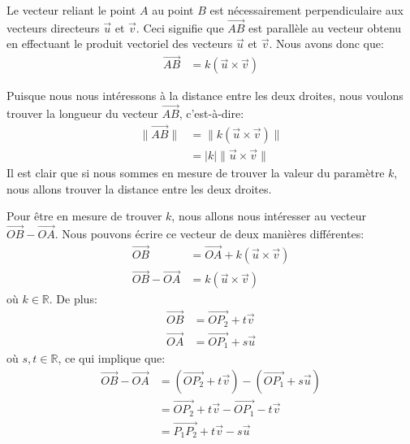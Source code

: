 \documentclass[]{book}
\theoremstyle{definition}
\theoremstyle{definition}
\theoremstyle{definition}
\theoremstyle{remark}
\begin{document}
Le vecteur reliant le point \(A\) au point \(B\) est nécessairement perpendiculaire aux vecteurs directeurs \(\vec u\) et \(\vec v\). Ceci signifie que \(\overrightarrow{AB}\) est parallèle au vecteur obtenu en effectuant le produit vectoriel des vecteurs \(\vec u\) et \(\vec v\). Nous avons donc que:
\begin{align*}
\overrightarrow{AB} &= k (\vec u \times \vec v)
\end{align*}

Puisque nous nous intéressons à la distance entre les deux droites, nous voulons trouver la longueur du vecteur \(\overrightarrow{AB}\), c'est-à-dire:
\begin{align*}
\lVert\overrightarrow{AB}\rVert &= \lVert k (\vec u \times \vec v)\rVert \\
&= |k| \lVert\vec u \times \vec v\rVert
\end{align*}
Il est clair que si nous sommes en mesure de trouver la valeur du paramètre \(k\), nous allons trouver la distance entre les deux droites.

Pour être en mesure de trouver \(k\), nous allons nous intéresser au vecteur \(\overrightarrow{OB}-\overrightarrow{OA}\). Nous pouvons écrire ce vecteur de deux manières différentes:
\begin{align*}
\overrightarrow{OB} &= \overrightarrow{OA} + k(\vec u \times \vec v) \\
\overrightarrow{OB}-\overrightarrow{OA} &= k(\vec u \times \vec v)
\end{align*}
où \(k\in\mathbb{R}\). De plus:
\begin{align*}
\overrightarrow{OB} &= \overrightarrow{OP_2} + t\vec v \\
\overrightarrow{OA} &= \overrightarrow{OP_1} + s\vec u
\end{align*}
où \(s,t\in\mathbb{R}\), ce qui implique que:
\begin{align*}
\overrightarrow{OB}-\overrightarrow{OA} &= (\overrightarrow{OP_2} + t\vec v)-(\overrightarrow{OP_1} + s\vec u) \\
&= \overrightarrow{OP_2} + t\vec v - \overrightarrow{OP_1} - t\vec v \\
&= \overrightarrow{P_1P_2} +t\vec v - s\vec u
\end{align*}
\end{document}
